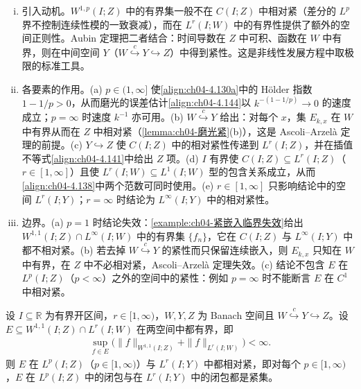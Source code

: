 \documentclass[../../main.tex]{subfiles}%
\begin{document}
\begin{remark}\label{remark:ch04-Aubin动机}
\begin{enumerate}[(i)]
\item 引入动机。$W^{1,p}(I;Z)$ 中的有界集一般不在 $C(I;Z)$ 中相对紧（差分的 $L^p$ 界不控制连续性模的一致衰减），而在 $L^r(I;W)$ 中的有界性提供了额外的空间正则性。Aubin 定理把二者结合：时间导数在 $Z$ 中可积、函数在 $W$ 中有界，则在中间空间 $Y$（$W\overset{c}{\hookrightarrow}Y\hookrightarrow Z$）中得到紧性。这是非线性发展方程中取极限的标准工具。

\item 各要素的作用。(a) $p\in(1,\infty]$ 使\eqref{align:ch04-4.130a}中的 Hölder 指数 $1-1/p>0$，从而磨光的误差估计\eqref{align:ch04-4.144}以 $k^{-(1-1/p)}\to0$ 的速度成立；$p=\infty$ 时速度 $k^{-1}$ 亦可用。(b) $W\overset{c}{\hookrightarrow}Y$ 给出：对每个 $x$，集 $E_{k,x}$ 在 $W$ 中有界从而在 $Z$ 中相对紧（\cref{lemma:ch04-磨光紧}(b)），这是 Ascoli--Arzelà 定理的前提。(c) $Y\hookrightarrow Z$ 使 $C(I;Z)$ 中的相对紧性传递到 $L^r(I;Z)$，并在插值不等式\eqref{align:ch04-4.141}中给出 $Z$ 项。(d) $I$ 有界使 $C(I;Z)\subseteq L^r(I;Z)$（$r\in[1,\infty]$）且使 $L^r(I;W)\subseteq L^1(I;W)$ 型的包含关系成立，从而\eqref{align:ch04-4.138}中两个范数可同时使用。(e) $r\in[1,\infty]$ 只影响结论中的空间 $L^r(I;Y)$；$r=\infty$ 时结论为 $L^\infty(I;Y)$ 中的相对紧性。

\item 边界。(a) $p=1$ 时结论失效：\cref{example:ch04-紧嵌入临界失效}给出 $W^{1,1}(I;Z)\cap L^\infty(I;W)$ 中的有界集 $\{f_n\}$，它在 $C(I;Z)$ 与 $L^\infty(I;Y)$ 中都不相对紧。(b) 若去掉 $W\overset{c}{\hookrightarrow}Y$ 的紧性而只保留连续嵌入，则 $E_{k,x}$ 只知在 $W$ 中有界，在 $Z$ 中不必相对紧，Ascoli--Arzelà 定理失效。(c) 结论不包含 $E$ 在 $L^p(I;Z)$（$p<\infty$）之外的空间中的紧性：例如 $p=\infty$ 时不能断言 $E$ 在 $C^1$ 中相对紧。
\end{enumerate}
\end{remark}

\begin{theorem}[Simon]\label{theorem:ch04-Simon}
设 $I\subseteq\mathbb{R}$ 为有界开区间，$r\in[1,\infty)$，$W,Y,Z$ 为 Banach 空间且 $W\overset{c}{\hookrightarrow}Y\hookrightarrow Z$。设 $E\subseteq W^{1,1}(I;Z)\cap L^r(I;W)$ 在两空间中都有界，即
\begin{align}
\sup_{f\in E}\big(\|f\|_{W^{1,1}(I;Z)}+\|f\|_{L^r(I;W)}\big)<\infty. \label{align:ch04-4.139}
\end{align}
则 $E$ 在 $L^p(I;Z)$（$p\in[1,\infty)$）与 $L^r(I;Y)$ 中都相对紧，即对每个 $p\in[1,\infty)$，$E$ 在 $L^p(I;Z)$ 中的闭包与在 $L^r(I;Y)$ 中的闭包都是紧集。
\end{theorem}
\end{document}

